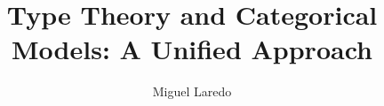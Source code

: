 \setlength{\bibitemsep}{0.6\baselineskip}

\newcommand{\la}{\lambda}
\newcommand{\La}{\mathbf{\Lambda}}
\newcommand{\Ty}{\mathbf{T}}
\newcommand{\Tb}{\mathbf{B}}
\newcommand{\Bset}{\mathcal{B}}
\newcommand{\Vset}{\mathcal{V}}
\newcommand{\Tset}{\mathcal{T}}
\newcommand{\NAT}{\mathbb{N}}
\newcommand{\IF}{\texttt{IF}}
\newcommand{\SUCC}{\texttt{SUCC}}
\newcommand{\TRUE}{\texttt{TRUE}}
\newcommand{\FALSE}{\texttt{FALSE}}
\newcommand{\FST}{\texttt{FST}}
\newcommand{\SND}{\texttt{SND}}
\newcommand{\PAIR}{\texttt{PAIR}}
\newcommand{\NIL}{\texttt{NIL}}
\newcommand{\NOT}{\texttt{NOT}}
\newcommand{\AND}{\texttt{AND}}
\newcommand{\OR}{\texttt{OR}}
\newcommand{\cat}[1]{\mathbf{#1}}
\newcommand{\Hom}{\mathrm{Hom}}
\newcommand{\id}{\mathrm{id}}
\newcommand{\Ob}{\mathrm{Ob}}
\newcommand{\Mor}{\mathrm{Mor}}
\newcommand{\Set}{\cat{Set}}
\newcommand{\Top}{\cat{Top}}
\newcommand{\Grp}{\cat{Grp}}
\newcommand{\Fun}{\mathrm{Fun}}
\newcommand{\op}{^{\mathrm{op}}}
\newcommand{\lCalc}{$\la$-Calculus}
\newcommand{\lcalc}{$\la$-calculus}
\newcommand{\bred}{$\beta$-reduction}
\newcommand{\lterm}{$\la$-term}
\newcommand{\lterms}{$\la$-terms}
\newcommand{\lexpr}{$\la$-expression}
\newcommand{\aequiv}{$\alpha$-equivalence}
\newcommand{\aequivlt}{$\alpha$-equivalent}
\newcommand{\bequiv}{$\beta$-equivalence}
\newcommand{\functionfont}[1]{\mathbf{#1}}
\newcommand{\curly}{\mathrel{\leadsto}_\beta}

\newcommand{\betared}{\mathrel{\leadsto}_{\beta\eta}}
\newcommand{\betareds}{\mathrel{\leadsto}^*_{\beta\eta}}
\newcommand{\psred}{\mathrel{\rightrightarrows}}

\newcommand{\Sub}[1]{\functionfont{Sub}(#1)}
\newcommand{\Subb}{\functionfont{Sub}}
\newcommand{\FV}[1]{\functionfont{FV}(#1)}
\newcommand{\FVV}{\functionfont{FV}}
\newcommand{\orange}[1]{\textcolor{orange}{#1}}
\newcommand{\magenta}[1]{\textcolor{magenta}{#1}}
\newcommand{\blue}[1]{\textcolor{blue}{#1}}
\newcommand{\green}[1]{\textcolor{green}{#1}}
\newcommand{\myref}[1]{\textcolor{refcolor}{\hyperref[#1]{\ref*{#1}}}}
\newcommand{\subst}[2]{[#1 := #2]}
\newcommand{\step}{\curly}
\newcommand{\etaequiv}{$\eta$-equivalence}
\newcommand{\lam}[2]{\lambda #1.\,#2}
\newcommand{\app}[2]{#1.\,#2}
\newcommand{\abs}[2]{\la #1.\,#2}
\newcommand{\curlysym}{\mathrel{\leftrightarrow}_\beta}
\renewcommand{\arraystretch}{1.2}
\setlength{\tabcolsep}{12pt}

\theoremstyle{definition}
\newtheorem{theorem}{Theorem}[section]
\newtheorem{lemma}[theorem]{Lemma}
\newtheorem{corollary}[theorem]{Corollary}
\newtheorem{definition}{Definition}[section]
\newtheorem{example}{Example}[section]
\newtheorem{remark}{Remark}
\newtheorem{proposition}[theorem]{Proposition}
\newtheorem{note}{Note}
\newtheorem{notation}{Notation}


\title{Type Theory and Categorical Models: A Unified Approach}
\author{Miguel Laredo}

